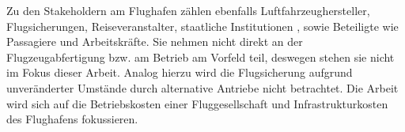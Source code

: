 %
Zu den Stakeholdern am Flughafen zählen ebenfalls Luftfahrzeughersteller, Flugsicherungen, 
Reiseveranstalter, staatliche Institutionen \cite{maertens2023neue},
sowie Beteiligte wie Passagiere und Arbeitskräfte. 
Sie nehmen nicht direkt an der Flugzeugabfertigung bzw. am Betrieb am Vorfeld teil, 
deswegen stehen sie nicht im Fokus dieser Arbeit.
Analog hierzu wird die Flugsicherung aufgrund unveränderter Umstände
durch alternative Antriebe nicht betrachtet. 
Die Arbeit wird sich auf die Betriebskosten einer Fluggesellschaft 
und Infrastrukturkosten des Flughafens fokussieren.
%
%
%
%
%
%
%
%
